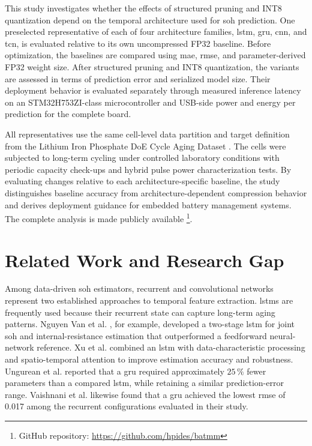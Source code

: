 \documentclass[final,3p,times]{elsarticle}
\begin{document}
This study investigates whether the effects of structured pruning and INT8 quantization depend on the temporal architecture used for \ac{soh} prediction. One preselected representative of each of four architecture families, \ac{lstm}, \ac{gru}, \ac{cnn}, and \ac{tcn}, is evaluated relative to its own uncompressed FP32 baseline. Before optimization, the baselines are compared using \ac{mae}, \ac{rmse}, and parameter-derived FP32 weight size. After structured pruning and INT8 quantization, the variants are assessed in terms of prediction error and serialized model size. Their deployment behavior is evaluated separately through measured inference latency on an STM32H753ZI-class microcontroller and USB-side power and energy per prediction for the complete board.

All representatives use the same cell-level data partition and target definition from the Lithium Iron Phosphate DoE Cycle Aging Dataset \cite{rzepka_design_2025}. The cells were subjected to long-term cycling under controlled laboratory conditions with periodic capacity check-ups and hybrid pulse power characterization tests. By evaluating changes relative to each architecture-specific baseline, the study distinguishes baseline accuracy from architecture-dependent compression behavior and derives deployment guidance for embedded battery management systems. The complete analysis is made publicly available \footnote{GitHub repository: \url{https://github.com/hpides/batmm}}.

\section{\texorpdfstring{Related Work and Research Gap}{Related Work and Research Gap}}
Among data-driven \ac{soh} estimators, recurrent and convolutional networks represent two established approaches to temporal feature extraction. \acp{lstm} are frequently used because their recurrent state can capture long-term aging patterns. Nguyen Van et al. \cite{nguyen_van_estimation_2023}, for example, developed a two-stage \ac{lstm} for joint \ac{soh} and internal-resistance estimation that outperformed a feedforward neural-network reference. Xu et al. \cite{xu_lstm-based_2024} combined an \ac{lstm} with data-characteristic processing and spatio-temporal attention to improve estimation accuracy and robustness. Ungurean et al. \cite{ungurean_online_2020} reported that a \ac{gru} required approximately $25\,\%$ fewer parameters than a compared \ac{lstm}, while retaining a similar prediction-error range. Vaishnani et al. \cite{vaishnani_deep_2024} likewise found that a \ac{gru} achieved the lowest \ac{rmse} of 0.017 among the recurrent configurations evaluated in their study.
\end{document}
